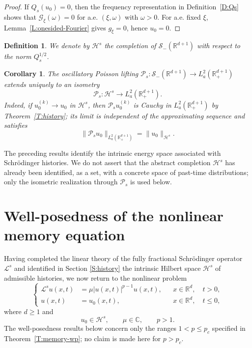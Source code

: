 \documentclass[11pt,letter]{amsart}
\def \RNu {\mathbb{R}^{d+1}}
\def \RN {\mathbb{R}_+^{d+1}}
\newcommand{\Rd}{\mathbb R^d}
\numberwithin{equation}{section}
\newcommand{\C}{\mathbb{C}}
\newcommand{\Le}{\mathcal L}
\newcommand{\Sm}{\mathscr S_-(\RNu)}
\newtheorem{corollary}[theorem]{Corollary}
\newtheorem{definition}[theorem]{Definition}
\numberwithin{equation}{section}
\begin{document}
\begin{proof}
If $Q_s(u_0)=0$, then the frequency representation in Definition~\ref{D:Qs}
shows that $\mathscr G_\xi(\omega)=0$ for a.e. $(\xi,\omega)$ with $\omega>0$.
For a.e. fixed $\xi$, Lemma~\ref{L:onesided-Fourier} gives $g_\xi=0$, hence
$u_0=0$.
\end{proof}

\begin{definition}\label{D:history}
We denote by $\mathcal H^s$ the completion of $\Sm$ with respect to the norm
$Q_s^{1/2}$.
\end{definition}

\begin{corollary}\label{C:extends}
The oscillatory Poisson lifting
$\mathcal P_s:\Sm\to L_a^2(\RN)$ extends uniquely to an isometry
\[
\mathcal P_s:\mathcal H^s\longrightarrow L_a^2(\RN).
\]
Indeed, if $u_0^{(k)}\to u_0$ in $\mathcal H^s$, then
$\mathcal P_su_0^{(k)}$ is Cauchy in $L_a^2(\RN)$ by Theorem~\ref{T:history}; its limit
is independent of the approximating sequence and satisfies
\[
\|\mathcal P_su_0\|_{L_a^2(\RN)}=\|u_0\|_{\mathcal H^s}.
\]
\end{corollary}



The preceding results identify the intrinsic energy space associated with
Schr\"odinger histories. We do not assert that the abstract completion
$\mathcal H^s$ has already been identified, as a set, with a concrete space of
past-time distributions; only the isometric realization through $\mathcal P_s$
is used below.

\section{Well-posedness of the nonlinear memory equation}\label{S:memory}
\label{S:wellpos}

Having completed the linear theory of the fully fractional
Schr\"odinger operator \(\Le^s\) and identified in Section
\ref{S:history} the intrinsic Hilbert space \(\mathcal H^s\) of
admissible histories, we now return to the nonlinear problem
\begin{equation}\label{E:nonlinear-memory}
\left\{
\begin{aligned}
\Le^s u(x,t)
&=
\mu |u(x,t)|^{p-1}u(x,t),
&& x\in\Rd,\quad t>0,
\\
u(x,t)
&=
u_0(x,t),
&& x\in\Rd,\quad t\leq0,
\end{aligned}
\right.
\end{equation}
where $d\ge1$ and
\[
u_0\in\mathcal H^s,\qquad \mu\in\C,\qquad p>1.
\]
The well-posedness results below concern only the ranges $1<p\le p_c$ specified in Theorem~\ref{T:memory-wp}; no claim is made here for $p>p_c$.
\end{document}
